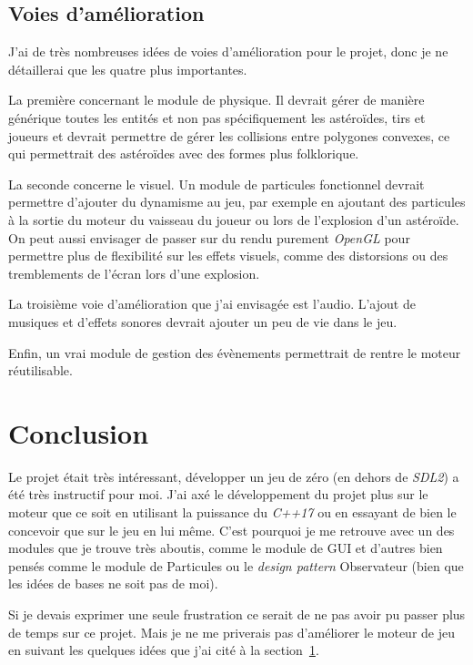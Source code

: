 \documentclass[10pt, french, a4paper]{report}
\begin{document}
\section{Voies d'amélioration}
\label{sec:voies-amelioration}

J'ai de très nombreuses idées de  voies d'amélioration pour le projet, donc je ne détaillerai que les quatre plus importantes.

La  première concernant le module de physique. Il devrait gérer de manière générique
toutes les entités et non pas spécifiquement les astéroïdes, tirs et joueurs et devrait 
permettre de gérer les collisions entre polygones convexes, ce qui permettrait des 
astéroïdes avec des formes plus folklorique.

La seconde concerne le visuel. Un module de particules fonctionnel devrait permettre 
d'ajouter du dynamisme au jeu, par exemple en ajoutant des particules à la sortie du 
moteur du vaisseau du joueur ou lors de l'explosion d'un astéroïde. On peut aussi 
envisager de passer sur du rendu purement \textit{OpenGL} pour permettre plus de 
flexibilité sur les effets visuels, comme des distorsions ou des tremblements de 
l'écran lors d'une explosion.

La troisième voie d'amélioration que j'ai envisagée est l'audio. 
L'ajout de musiques et d'effets sonores devrait ajouter un peu de vie dans le jeu.

Enfin, un vrai module de gestion des évènements permettrait de rentre le moteur 
réutilisable.



\chapter*{Conclusion}

Le projet était très intéressant, développer un jeu de zéro (en dehors de \textit{SDL2})
a été très instructif pour moi. J'ai axé le développement du projet plus sur le 
moteur que ce soit en utilisant la puissance du \textit{C++17} ou en essayant
de bien le concevoir que sur le jeu en lui même. C'est pourquoi je me retrouve
avec un des modules que je trouve très aboutis, comme le module de GUI et d'autres 
bien pensés comme le module de Particules ou le \textit{design pattern} Observateur 
(bien que les idées de bases ne soit pas de moi).

Si je devais exprimer une seule frustration ce serait de ne pas avoir pu passer plus
de temps sur ce projet. Mais je ne me priverais pas d'améliorer le moteur de jeu
en suivant les quelques idées que j'ai cité à la section~\ref{sec:voies-amelioration}.
\end{document}
